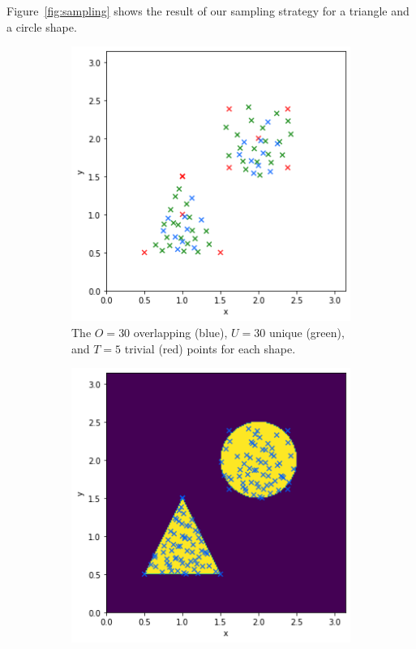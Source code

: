 Figure~\ref{fig:sampling} shows the result of our sampling strategy for
a triangle and a circle shape.

\begin{figure}
  \centering
  \begin{subfigure}[t]{0.48\textwidth}
    \centering
    \includegraphics[width=\textwidth]{figures/sampling/points.png}
    \caption{The $O=30$ overlapping (blue), $U=30$ unique (green), and $T=5$
    trivial (red) points for each shape.}
  \end{subfigure}
  \begin{subfigure}[t]{0.48\textwidth}
    \centering
    \includegraphics[width=\textwidth]{figures/sampling/smokes_no_bar.png}

\end{subfigure}
\end{figure}

